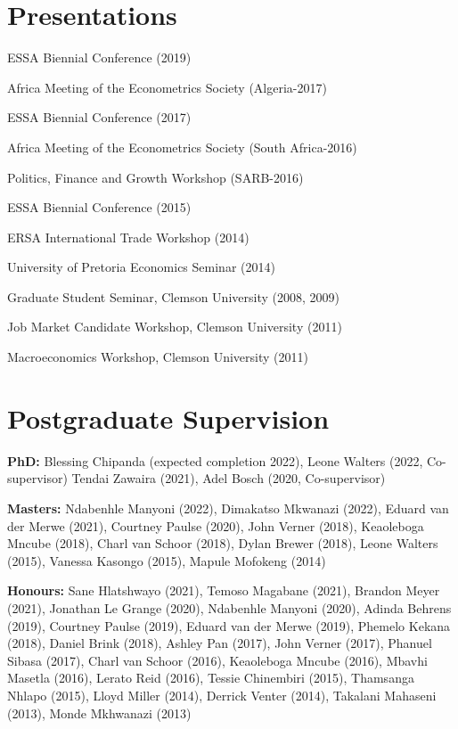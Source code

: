 \documentclass[margin,line]{res}                          %
\newenvironment{list1}{
  \begin{list}{\ding{113}}{%
      \setlength{\itemsep}{0.4em}
      \setlength{\parsep}{0in} \setlength{\parskip}{0in}
      \setlength{\topsep}{0in} \setlength{\partopsep}{0in} 
      \setlength{\leftmargin}{0.17in}}}{\end{list}}
\begin{document}
\begin{resume}
\section{\sc Presentations}
\begin{list1}
\item[] ESSA Biennial Conference (2019)
\item[] Africa Meeting of the Econometrics Society (Algeria-2017)
\item[] ESSA Biennial Conference (2017)
\item[] Africa Meeting of the Econometrics Society (South Africa-2016)
\item[] Politics, Finance and Growth Workshop (SARB-2016)
\item[] ESSA Biennial Conference (2015)
\item[] ERSA International Trade Workshop (2014)
\item[] University of Pretoria Economics Seminar (2014)
\item[] Graduate Student Seminar, Clemson University (2008, 2009)
\item[] Job Market Candidate Workshop, Clemson University (2011)
\item[] Macroeconomics Workshop, Clemson University (2011)
\end{list1}

\section{\sc Postgraduate Supervision}
\begin{list1}
\item[] \textbf{PhD: }Blessing Chipanda (expected completion 2022), Leone Walters (2022, Co-supervisor) Tendai Zawaira (2021), Adel Bosch (2020, Co-supervisor)
\item[] \textbf{Masters: } Ndabenhle Manyoni (2022), Dimakatso Mkwanazi (2022), Eduard van der Merwe (2021), Courtney Paulse (2020), John Verner (2018), Keaoleboga Mncube (2018), Charl van Schoor (2018), Dylan Brewer (2018), Leone Walters (2015), Vanessa Kasongo (2015), Mapule Mofokeng (2014)
\item[] \textbf{Honours: } Sane Hlatshwayo (2021), Temoso Magabane (2021), Brandon Meyer (2021), Jonathan Le Grange (2020), Ndabenhle Manyoni (2020), Adinda Behrens (2019), Courtney Paulse (2019), Eduard van der Merwe (2019), Phemelo Kekana (2018), Daniel Brink (2018), Ashley Pan (2017), John Verner (2017), Phanuel Sibasa (2017), Charl van Schoor (2016), Keaoleboga Mncube (2016), Mbavhi Masetla (2016), Lerato Reid (2016), Tessie Chinembiri (2015), Thamsanga Nhlapo (2015), Lloyd Miller (2014), Derrick Venter (2014), Takalani Mahaseni (2013), Monde Mkhwanazi (2013)
\end{list1}


\end{resume}
\end{document}
